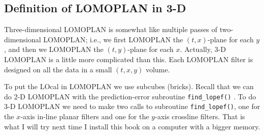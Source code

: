 \subsection{Definition of LOMOPLAN in 3-D}
Three-dimensional LOMOPLAN is somewhat like multiple passes
of two-dimensional LOMOPLAN;
i.e., we first LOMOPLAN the $(t,x)$-plane for each $y$,
and then we
LOMOPLAN the $(t,y)$-plane for each $x$.
Actually, 3-D LOMOPLAN is
a little more complicated than this.
Each LOMOPLAN filter is designed on all the data in a small $(t,x,y)$ volume.
\par

\par
To put the LOcal in LOMOPLAN we use subcubes (bricks).
Recall that we can do 2-D LOMOPLAN with
the prediction-error subroutine 
\texttt{find\_lopef()} .
To do 3-D LOMOPLAN we need to make two calls to subroutine
{\tt find\_lopef()},
one for the $x$-axis in-line planar filters
and one for the $y$-axis crossline filters.
That is what I will try next time
I install this book on a computer with a bigger memory.

